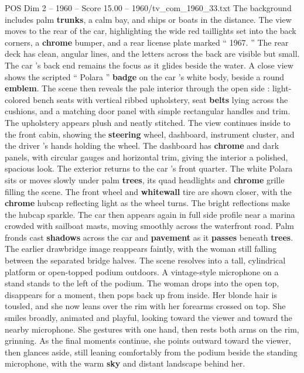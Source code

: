\begin{textsample}{POS Dim 2 – 1960 – Score 15.00 – 1960/tv\_com\_1960\_33.txt}
The background includes palm \textbf{trunks}, a calm bay, and ships or boats in the distance.
The view moves to the rear of the car, highlighting the wide red taillights set into the back corners, a \textbf{chrome} bumper, and a rear license plate marked “ 1967. ” The rear deck has clean, angular lines, and the letters across the back are visible but small.
The car ’s back end remains the focus as it glides beside the water.
A close view shows the scripted “ Polara ” \textbf{badge} on the car ’s white body, beside a round \textbf{emblem}.
The scene then reveals the pale interior through the open side : light-colored bench seats with vertical ribbed upholstery, seat \textbf{belts} lying across the cushions, and a matching door panel with simple rectangular handles and trim.
The upholstery appears plush and neatly stitched.
The view continues inside to the front cabin, showing the \textbf{steering} wheel, dashboard, instrument cluster, and the driver ’s hands holding the wheel.
The dashboard has \textbf{chrome} and dark panels, with circular gauges and horizontal trim, giving the interior a polished, spacious look.
The exterior returns to the car ’s front quarter.
The white Polara sits or moves slowly under palm \textbf{trees}, its quad headlights and \textbf{chrome} grille filling the scene.
The front wheel and \textbf{whitewall} tire are shown closer, with the \textbf{chrome} hubcap reflecting light as the wheel turns.
The bright reflections make the hubcap sparkle.
The car then appears again in full side profile near a marina crowded with sailboat masts, moving smoothly across the waterfront road.
Palm fronds cast \textbf{shadows} across the car and \textbf{pavement} as it \textbf{passes} beneath \textbf{trees}.
The earlier drawbridge image reappears faintly, with the woman still falling between the separated bridge halves.
The scene resolves into a tall, cylindrical platform or open-topped podium outdoors.
A vintage-style microphone on a stand stands to the left of the podium.
The woman drops into the open top, disappears for a moment, then pops back up from inside.
Her blonde hair is tousled, and she now leans over the rim with her forearms crossed on top.
She smiles broadly, animated and playful, looking toward the viewer and toward the nearby microphone.
She gestures with one hand, then rests both arms on the rim, grinning.
As the final moments continue, she points outward toward the viewer, then glances aside, still leaning comfortably from the podium beside the standing microphone, with the warm \textbf{sky} and distant landscape behind her.

\end{textsample}

